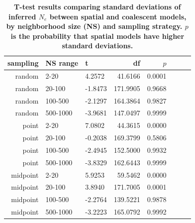 \documentclass[11pt,twoside,lineno]{preprint}
\begin{document}
\begin{table}[ht]
\small
\centering
\caption{\bf T-test results comparing standard deviations of inferred $N_{e}$ between spatial and coalescent models, by neighborhood size (NS) and sampling strategy. $p$ is the probability that spatial models have higher standard deviations.}
\begin{tabular}{rllrrrrr}
  \hline
sampling & NS range & t & df & $p$ \\ 
  \hline
random & 2-20 & 4.2572 & 41.6166 & 0.0001 \\ 
random & 20-100 & -1.8473 & 171.9905 & 0.9668 \\ 
random & 100-500 & -2.1297 & 164.3864  & 0.9827 \\ 
random & 500-1000 & -3.9681 & 147.0497 & 0.9999 \\ 
point & 2-20 & 7.0802 & 44.3615  & 0.0000 \\ 
point & 20-100 & -0.2038 & 169.3799 & 0.5806 \\ 
point & 100-500 & -2.4945 & 152.5000 & 0.9932 \\ 
point & 500-1000 & -3.8329 & 162.6443& 0.9999 \\ 
midpoint & 2-20 & 5.9253 & 59.5462 & 0.0000 \\ 
midpoint & 20-100 & 3.8940 & 171.7005  & 0.0001 \\ 
midpoint & 100-500 & -2.2764 & 139.5221 & 0.9878 \\ 
midpoint & 500-1000 & -3.2223 & 165.0792 & 0.9992 \\ 
   \hline
\end{tabular}
\label{table:demography}
\end{table}


\stopsupplement
\end{document}
